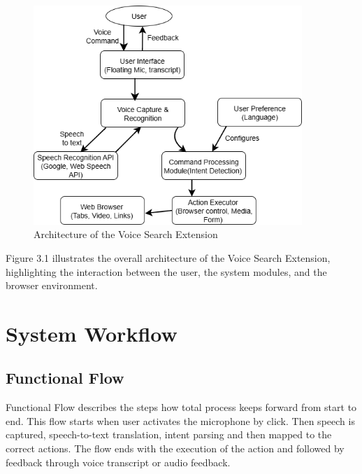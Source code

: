 \begin{figure}[H]
   \centering
   \includegraphics[width=4in]{latex/Chap3/system_architecture.png}
   \caption{Architecture of the Voice Search Extension}
   \label{fig:model}
\end{figure}
Figure 3.1 illustrates the overall architecture of the Voice Search Extension, highlighting the interaction between the user, the system modules, and the browser environment.


\section{System Workflow}
\subsection{Functional Flow}
Functional Flow describes the steps how total process keeps forward from start to end. This flow starts when user activates the microphone by click. Then speech is captured, speech-to-text translation, intent parsing and then mapped to the correct actions. The flow ends with the execution of the action and followed by feedback through voice transcript or audio feedback.


